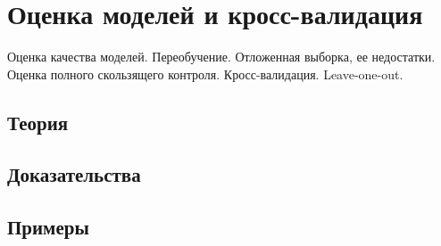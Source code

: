 
\section{Оценка моделей и кросс-валидация}
\label{sec:1.4.08-model-evaluation}

\begin{ticket}
Оценка качества моделей. Переобучение. Отложенная выборка, ее недостатки. Оценка полного скользящего контроля. Кросс-валидация. Leave-one-out.
\end{ticket}

\subsection*{Теория}

\subsection*{Доказательства}

\subsection*{Примеры}
